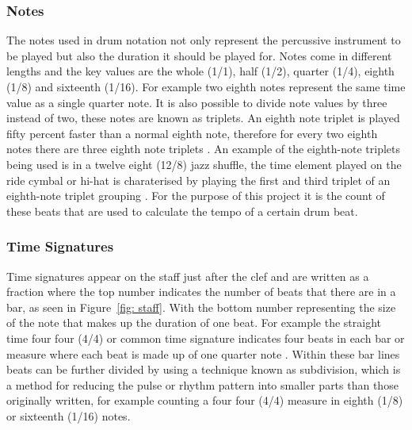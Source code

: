 \documentclass[a4paper, 11pt]{article}
\begin{document}
\subsubsection{Notes}
The notes used in drum notation not only represent the percussive instrument to be played but also the duration it should be played for. Notes come in different lengths and the key values are the whole (1/1), half (1/2), quarter (1/4), eighth (1/8) and sixteenth (1/16). For example two eighth notes represent the same time value as a single quarter note. It is also possible to divide note values by three instead of two, these notes are known as triplets. An eighth note triplet is played fifty percent faster than a normal eighth note, therefore for every two eighth notes there are three eighth note triplets \cite{drum-note}. An example of the eighth-note triplets being used is in a twelve eight (12/8) jazz shuffle, the time element played on the ride cymbal or hi-hat is charaterised by playing the first and third triplet of an eighth-note triplet grouping \cite{drum-bible}. For the purpose of this project it is the count of these beats that are used to calculate the tempo of a certain drum beat.

\subsubsection{Time Signatures}\label{sec: ts}
Time signatures appear on the staff just after the clef and are written as a fraction where the top number indicates the number of beats that there are in a bar, as seen in Figure~\ref{fig: staff}. With the bottom number representing the size of the note that makes up the duration of one beat. For example the straight time four four (4/4) or common time signature indicates four beats in each bar or measure where each beat is made up of one quarter note \cite{drum-note}. Within these bar lines beats can be further divided by using a technique known as subdivision, which is a method for reducing the pulse or rhythm pattern into smaller parts than those originally written, for example counting a four four (4/4) measure in eighth (1/8) or sixteenth (1/16) notes. 
\end{document}
